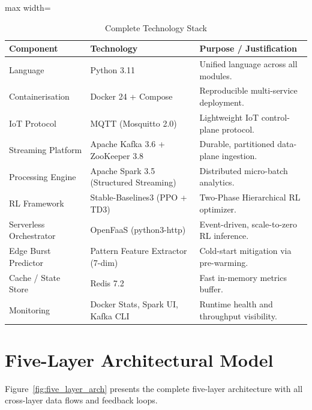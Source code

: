 \begin{table}[H]
\centering
\caption{Complete Technology Stack}
\label{tab:tech_stack}
\begin{adjustbox}{max width=\textwidth}
\begin{tabular}{|p{3.2cm}|p{4cm}|p{6.5cm}|}
\hline
\textbf{Component}       & \textbf{Technology}              & \textbf{Purpose / Justification} \\ \hline
Language                 & Python 3.11                      & Unified language across all modules. \\ \hline
Containerisation         & Docker 24 + Compose              & Reproducible multi-service deployment. \\ \hline
IoT Protocol             & MQTT (Mosquitto 2.0)             & Lightweight IoT control-plane protocol. \\ \hline
Streaming Platform       & Apache Kafka 3.6 + ZooKeeper 3.8 & Durable, partitioned data-plane ingestion. \\ \hline
Processing Engine        & Apache Spark 3.5 (Structured Streaming) & Distributed micro-batch analytics. \\ \hline
RL Framework             & Stable-Baselines3 (PPO + TD3)    & Two-Phase Hierarchical RL optimizer. \\ \hline
Serverless Orchestrator  & OpenFaaS (python3-http)          & Event-driven, scale-to-zero RL inference. \\ \hline
Edge Burst Predictor     & Pattern Feature Extractor (7-dim)& Cold-start mitigation via pre-warming. \\ \hline
Cache / State Store      & Redis 7.2                        & Fast in-memory metrics buffer. \\ \hline
Monitoring               & Docker Stats, Spark UI, Kafka CLI & Runtime health and throughput visibility. \\ \hline
\end{tabular}
\end{adjustbox}
\end{table}

\section{Five-Layer Architectural Model}
\label{sec:five_layer}
Figure~\ref{fig:five_layer_arch} presents the complete five-layer architecture with all
cross-layer data flows and feedback loops.

